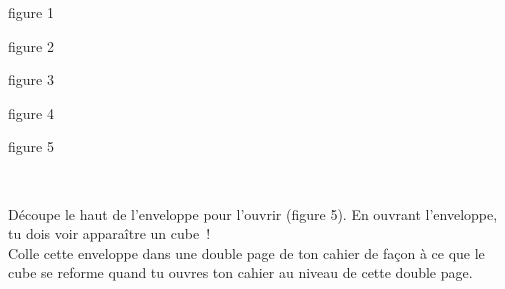 \begin{activite}
\begin{partie}
\begin{minipage}[c]{0.19\linewidth}
\begin{center} figure 1 \end{center}
 \end{minipage} \hfill%
\begin{minipage}[c]{0.19\linewidth}
 \begin{center} \qquad figure 2 \end{center}
 \end{minipage} \hfill%
\begin{minipage}[c]{0.19\linewidth}
\begin{center} \qquad figure 3 \end{center}
 \end{minipage} \hfill%
\begin{minipage}[c]{0.19\linewidth}
\begin{center} figure 4 \end{center}
 \end{minipage} \hfill%
\begin{minipage}[c]{0.19\linewidth}
\begin{center} figure 5 \end{center}
 \end{minipage} \\
\end{partie}

\begin{partie}[Abracadabra !]
Découpe le haut de l'enveloppe pour l'ouvrir (figure 5). En ouvrant l'enveloppe, tu dois voir apparaître un cube !  \\[0.5em]
Colle cette enveloppe dans une double page de ton cahier de façon à ce que le cube se reforme quand tu ouvres ton cahier au niveau de cette double page.
\end{partie}

\end{activite}


